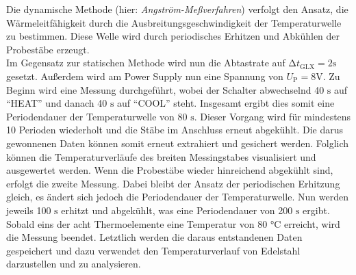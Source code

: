 Die dynamische Methode (hier: \emph{Angström-Meßverfahren}) verfolgt den Ansatz, die Wärmeleitfähigkeit durch die Ausbreitungsgeschwindigkeit der Temperaturwelle zu bestimmen. Diese Welle
wird durch periodisches Erhitzen und Abkühlen der Probestäbe erzeugt. \\ Im Gegensatz zur statischen Methode wird nun die Abtastrate auf $\increment t_\text{GLX} = 2 \unit{\second}$ gesetzt.
Außerdem wird am Power Supply nun eine Spannung von $U_\text{P} = 8 \unit{\volt}$. Zu Beginn wird eine Messung durchgeführt, wobei der Schalter abwechselnd 40 $\unit{\second}$ auf \enquote{HEAT} und danach 40 $\unit{\second}$ auf \enquote{COOL} steht. Insgesamt ergibt dies somit eine 
Periodendauer der Temperaturwelle von 80 $\unit{\second}$. Dieser Vorgang wird für mindestens 10 Perioden wiederholt und die Stäbe im Anschluss erneut abgekühlt. Die darus gewonnenen Daten können somit erneut extrahiert
und gesichert werden. Folglich können die Temperaturverläufe des breiten Messingstabes visualisiert und ausgewertet werden. Wenn die Probestäbe wieder hinreichend abgekühlt sind, erfolgt die zweite Messung.
Dabei bleibt der Ansatz der periodischen Erhitzung gleich, es ändert sich jedoch die Periodendauer der Temperaturwelle. Nun werden jeweils 100 $\unit{\second}$ erhitzt und abgekühlt, was eine Periodendauer von
200 $\unit{\second}$ ergibt. Sobald eins der acht Thermoelemente eine Temperatur von 80 $\unit{\celsius}$ erreicht, wird die Messung beendet. Letztlich werden die daraus entstandenen Daten gespeichert und dazu verwendet 
den Temperaturverlauf von Edelstahl darzustellen und zu analysieren.
  


